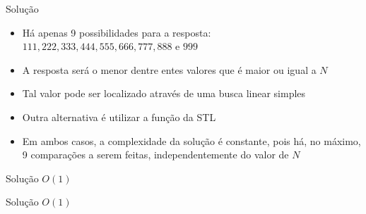 \begin{frame}[fragile]{Solução}

    \begin{itemize}
        \item Há apenas 9 possibilidades para a resposta: $111, 222, 333, 444, 555, 666, 777,
            888$ e $999$

        \item A resposta será o menor dentre entes valores que é maior ou igual a $N$

        \item Tal valor pode ser localizado através de uma busca linear simples

        \item Outra alternativa é utilizar a função  da STL

        \item Em ambos casos, a complexidade da solução é constante, pois há, no máximo, 9
            comparações a serem feitas, independentemente do valor de $N$
    \end{itemize}

\end{frame}

\begin{frame}[fragile]{Solução $O(1)$}
\end{frame}

\begin{frame}[fragile]{Solução $O(1)$}
\end{frame}
